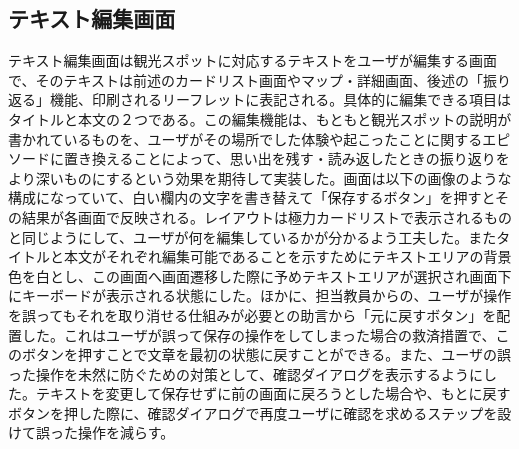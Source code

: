 \subsection{テキスト編集画面}
テキスト編集画面は観光スポットに対応するテキストをユーザが編集する画面で、そのテキストは前述のカードリスト画面やマップ・詳細画面、後述の「振り返る」機能、印刷されるリーフレットに表記される。具体的に編集できる項目はタイトルと本文の２つである。この編集機能は、もともと観光スポットの説明が書かれているものを、ユーザがその場所でした体験や起こったことに関するエピソードに置き換えることによって、思い出を残す・読み返したときの振り返りをより深いものにするという効果を期待して実装した。画面は以下の画像のような構成になっていて、白い欄内の文字を書き替えて「保存するボタン」を押すとその結果が各画面で反映される。レイアウトは極力カードリストで表示されるものと同じようにして、ユーザが何を編集しているかが分かるよう工夫した。またタイトルと本文がそれぞれ編集可能であることを示すためにテキストエリアの背景色を白とし、この画面へ画面遷移した際に予めテキストエリアが選択され画面下にキーボードが表示される状態にした。ほかに、担当教員からの、ユーザが操作を誤ってもそれを取り消せる仕組みが必要との助言から「元に戻すボタン」を配置した。これはユーザが誤って保存の操作をしてしまった場合の救済措置で、このボタンを押すことで文章を最初の状態に戻すことができる。また、ユーザの誤った操作を未然に防ぐための対策として、確認ダイアログを表示するようにした。テキストを変更して保存せずに前の画面に戻ろうとした場合や、もとに戻すボタンを押した際に、確認ダイアログで再度ユーザに確認を求めるステップを設けて誤った操作を減らす。
